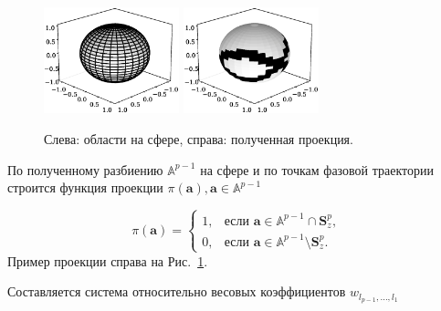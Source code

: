 \documentclass[article,14pt,subf,href,colorlinks=true
]{disser}
\begin{document}
\begin{figure}[h]
\centering
  {\includegraphics[width=0.35\textwidth]{figs/sphere_grid.eps}}
  {\includegraphics[width=0.35\textwidth]{figs/pi_walk.eps}}\\
\caption{Слева: области на сфере, справа: полученная проекция.}
\label{fg:sp_mesh}
\end{figure}

По полученному разбиению $\mathbb{A}^{p-1}$ на сфере и по точкам фазовой траектории строится функция проекции $\pi(\mathbf{a}), \mathbf{a} \in \mathbb{A}^{p-1}$

\begin{equation}
    \pi(\mathbf{a}) =
    \begin{cases}
	1, & \mbox{если } \mathbf{a} \in \mathbb{A}^{p-1} \cap \mathbf{S}_{z}^{p},\\
    0, & \mbox{если } \mathbf{a} \in \mathbb{A}^{p-1} \setminus \mathbf{S}_{z}^{p}.
    \end{cases}
\label{eq:f_real}
\end{equation}
Пример проекции справа на Рис.~\ref{fg:sp_mesh}.

Составляется система относительно весовых коэффициентов $w_{l_{p-1},...,l_1}$ 
\end{document}

